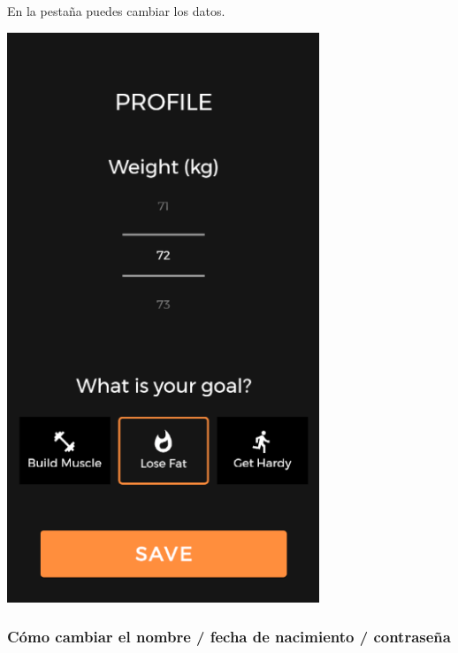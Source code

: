 \documentclass[12pt,a4paper]{article}
\begin{document}
\begin{enumerate}
\begin{minipage}{.60\textwidth}
  \item En la pestaña puedes cambiar los datos.
\end{minipage}
\begin{minipage}{.40\textwidth}
  \includegraphics[width=0.7\textwidth, right]{cambiardatosusuario}
\end{minipage}

\end{enumerate}

\clearpage

\subsubsection{Cómo cambiar el nombre / fecha de nacimiento / contraseña}
\end{document}
